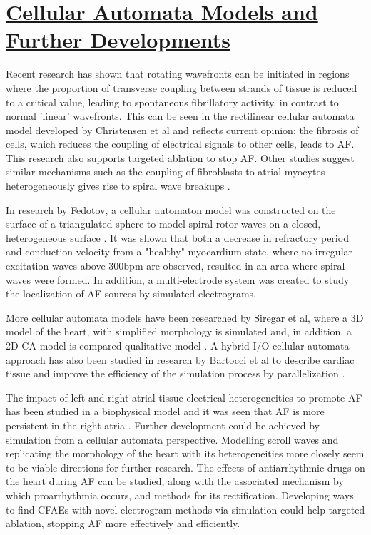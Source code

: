 \documentclass[twocolumn, a1paper]{article}
\begin{document}
\section{\textbf{\underline{Cellular Automata Models and}\\ \underline{Further Developments}}}





Recent research has shown that rotating wavefronts can be initiated in regions where the proportion of transverse coupling between strands of tissue is reduced to a critical value, leading to spontaneous fibrillatory activity, in contrast to normal 'linear' wavefronts. This can be seen in the rectilinear cellular automata model developed by Christensen et al and reflects current opinion: the fibrosis of cells, which reduces the coupling of electrical signals to other cells, leads to AF\cite{Christensen}. This research also supports targeted ablation to stop AF. Other studies suggest similar mechanisms such as the coupling of fibroblasts to atrial myocytes heterogeneously gives rise to spiral wave breakups \cite{Ozawa}.


In research by Fedotov, a cellular automaton model was constructed on the surface of a triangulated sphere to model spiral rotor waves on a closed, heterogeneous surface \cite{Fedotov}. It was shown that both a decrease in refractory period and conduction velocity from a "healthy" myocardium state, where no irregular excitation waves above 300bpm are observed, resulted in an area where spiral waves were formed. In addition, a multi-electrode system was created to study the localization of AF sources by simulated electrograms. 


More cellular automata models have been researched by Siregar et al, where a 3D model of the heart, with simplified morphology is simulated and, in addition, a 2D CA model is compared qualitative model \cite{Siregar} \cite{Siregar2}. A hybrid I/O cellular automata approach has also been studied in research by Bartocci et al to describe cardiac tissue and improve the efficiency of the simulation process by parallelization \cite{Bartocci}.

 The impact of left and right atrial tissue electrical heterogeneities to promote AF has been studied in a biophysical model and it was seen that AF is more persistent in the right atria \cite{Luca}. Further development could be achieved by simulation from a cellular automata perspective. Modelling scroll waves and replicating the morphology of the heart with its heterogeneities more closely seem to be viable directions for further research. The effects of antiarrhythmic drugs on the heart during AF can be studied, along with the associated mechanism by which proarrhythmia occurs, and methods for its rectification. Developing ways to find CFAEs with novel electrogram methods via simulation could help targeted ablation, stopping AF more effectively and efficiently. 
\end{document}
